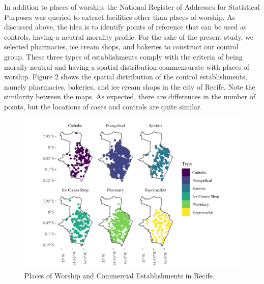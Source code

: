 \documentclass[smallextended]{svjour3}       %
\begin{document}
In addition to places of worship, the National Register of Addresses for
Statistical Purposes was queried to extract facilities other than places
of worship. As discussed above, the idea is to identify points of
reference that can be used as controls, having a neutral morality
profile. For the sake of the present study, we selected pharmacies, ice
cream shops, and bakeries to construct our control group. These three
types of establishments comply with the criteria of being morally
neutral and having a spatial distribution commensurate with places of
worship. Figure 2 shows the spatial distribution of the control
establishments, namely pharmacies, bakeries, and ice cream shops in the
city of Recife. Note the similarity between the maps. As expected, there
are differences in the number of points, but the locations of cases and
controls are quite similar.

\begin{figure}

\includegraphics{Moral_Communities_and_Crime_v1_files/figure-latex/plot-events-1} \hfill{}

\caption{\label{fig:plot-events}Places of Worship and Commercial Establishments in Recife}\label{fig:plot-events}
\end{figure}
\end{document}
